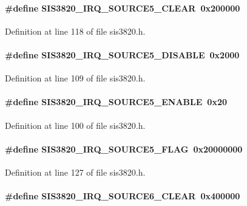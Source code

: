 \paragraph[{SIS3820\_\-IRQ\_\-SOURCE5\_\-CLEAR}]{\setlength{\rightskip}{0pt plus 5cm}\#define SIS3820\_\-IRQ\_\-SOURCE5\_\-CLEAR~0x200000}\hfill\label{sis3820_8h_a924ee6681f2d0aa8280c5f6fd9e153c0}


Definition at line 118 of file sis3820.h.
\paragraph[{SIS3820\_\-IRQ\_\-SOURCE5\_\-DISABLE}]{\setlength{\rightskip}{0pt plus 5cm}\#define SIS3820\_\-IRQ\_\-SOURCE5\_\-DISABLE~0x2000}\hfill\label{sis3820_8h_a8452354973f53cc74f3463b2a2b6b5d2}


Definition at line 109 of file sis3820.h.
\paragraph[{SIS3820\_\-IRQ\_\-SOURCE5\_\-ENABLE}]{\setlength{\rightskip}{0pt plus 5cm}\#define SIS3820\_\-IRQ\_\-SOURCE5\_\-ENABLE~0x20}\hfill\label{sis3820_8h_ac9a30f930915e1072a881a7dae4c0f86}


Definition at line 100 of file sis3820.h.
\paragraph[{SIS3820\_\-IRQ\_\-SOURCE5\_\-FLAG}]{\setlength{\rightskip}{0pt plus 5cm}\#define SIS3820\_\-IRQ\_\-SOURCE5\_\-FLAG~0x20000000}\hfill\label{sis3820_8h_aa00a4d636d016f540156e7679c0f02d1}


Definition at line 127 of file sis3820.h.
\paragraph[{SIS3820\_\-IRQ\_\-SOURCE6\_\-CLEAR}]{\setlength{\rightskip}{0pt plus 5cm}\#define SIS3820\_\-IRQ\_\-SOURCE6\_\-CLEAR~0x400000}\hfill\label{sis3820_8h_a9d4a7bc50539a78bb8e41e622fce1eae}


